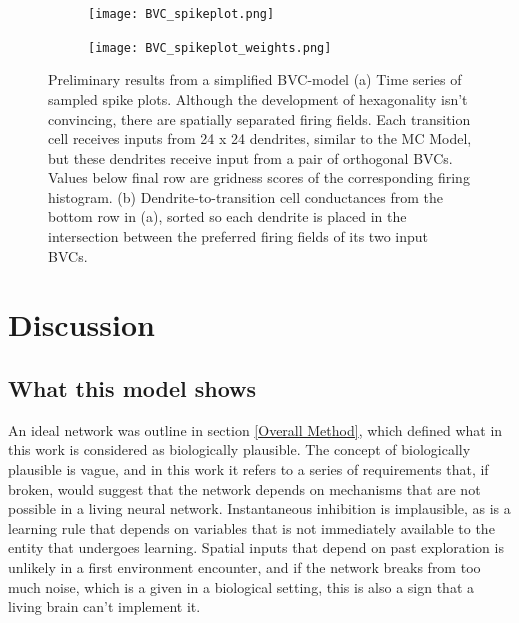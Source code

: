 \documentclass{article}
\begin{document}
    \begin{figure}[H]
        \begin{subfigure}{\textwidth}
            \subcaption{}
            \texttt{[image: BVC\_spikeplot.png]}
        \end{subfigure}
        \begin{subfigure}{\textwidth}
            \subcaption{}
            \hspace*{0.01\linewidth}
            \texttt{[image: BVC\_spikeplot\_weights.png]}
        \end{subfigure}

        \caption{Preliminary results from a simplified BVC-model (a) Time series of sampled spike plots. Although the development of hexagonality isn't convincing, there are spatially separated firing fields. Each transition cell receives inputs from 24 x 24 dendrites, similar to the MC Model, but these dendrites receive input from a pair of orthogonal BVCs. Values below final row are gridness scores of the corresponding firing histogram. (b) Dendrite-to-transition cell conductances from the bottom row in (a), sorted so each dendrite is placed in the intersection between the preferred firing fields of its two input BVCs.}
        \label{BVC_spikeplot}
    \end{figure}

    \newpage
    \section{Discussion} \label{Discussion}

    \subsection{What this model shows} \label{TheseResults}
    An ideal network was outline in section \ref{Overall Method}, which defined what in this work is considered as biologically plausible. The concept of biologically plausible is vague, and in this work it refers to a series of requirements that, if broken, would suggest that the network depends on mechanisms that are not possible in a living neural network. Instantaneous inhibition is implausible, as is a learning rule that depends on variables that is not immediately available to the entity that undergoes learning. Spatial inputs that depend on past exploration is unlikely in a first environment encounter, and if the network breaks from too much noise, which is a given in a biological setting, this is also a sign that a living brain can't implement it.
\end{document}
